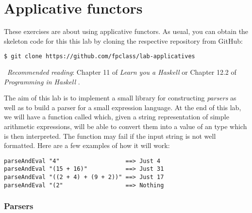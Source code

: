 \section{Applicative functors} \label{sec:applicatvies}

These exercises are about using applicative functors. As usual, you can obtain the skeleton code for this this lab by cloning the respective repository from GitHub:
\begin{verbatim}
$ git clone https://github.com/fpclass/lab-applicatives
\end{verbatim}

\makebox[0.5cm]{\faBook}~\emph{Recommended reading}: Chapter 11 of \emph{Learn you a Haskell} \citep{lipovaca2011learn} or Chapter 12.2 of \emph{Programming in Haskell} \citep{hutton2016programming}.

The aim of this lab is to implement a small library for constructing \emph{parsers} as well as to build a parser for a small expression language. At the end of this lab, we will have a function called  which, given a string representation of simple arithmetic expressions, will be able to convert them into a value of an  type which is then interpreted. The  function may fail if the input string is not well formatted. Here are a few examples of how it will work:
\begin{verbatim}
parseAndEval "4"                   ==> Just 4
parseAndEval "(15 + 16)"           ==> Just 31
parseAndEval "((2 + 4) + (9 + 2))" ==> Just 17
parseAndEval "(2"                  ==> Nothing
\end{verbatim}

\subsubsection{Parsers}

